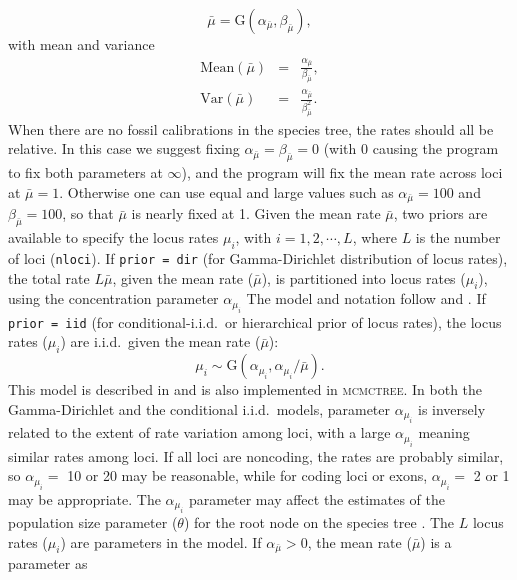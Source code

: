 \documentclass[a4paper]{book}
\numberwithin{equation}{section} \renewcommand{\baselinestretch}{0.55}
\begin{document}
\begin{displaymath}
  \bar{\mu} = \mathrm{G}(\alpha_{\bar{\mu}},\beta_{\bar{\mu}}),
\end{displaymath}
with mean and variance
\begin{eqnarray}
  \textrm{Mean}(\bar{\mu}) & = & \frac{\alpha_{\bar{\mu}}}{\beta_{\bar{\mu}}}, \nonumber \\
  \textrm{Var}(\bar{\mu}) & = & \frac{\alpha_{\bar{\mu}}}{\beta_{\bar{\mu}}^2}. \nonumber 
\end{eqnarray}
When there are no fossil calibrations in the species tree, the rates
should all be relative.  In this case we suggest fixing
$\alpha_{\bar{\mu}}=\beta_{\bar{\mu}}=0$ (with 0 causing the program
to fix both parameters at $\infty$), and the program will fix the mean
rate across loci at $\bar\mu = 1$.  Otherwise one can use equal and
large values such as $\alpha_{\bar{\mu}}=100$ and
$\beta_{\bar{\mu}}=100$, so that $\bar\mu$ is nearly fixed at 1.
Given the mean rate $\bar\mu$, two priors are available to specify the
locus rates $\mu_i$, with $i = 1, 2, \cdots, L$, where $L$ is the
number of loci (\texttt{nloci}).  If \texttt{prior = dir} (for
Gamma-Dirichlet distribution of locus rates), the total rate
$L\bar\mu$, given the mean rate ($\bar\mu$), is partitioned into locus
rates ($\mu_i$), using the concentration parameter $\alpha_{\mu_i}$
The model and notation follow \citet[][eq.~4]{Burgess2008} and
\citet[][eqs.~3-5]{dosReis2014}.  If \texttt{prior = iid} (for
conditional-i.i.d.\ or hierarchical prior of locus rates), the locus
rates ($\mu_i$) are i.i.d.\ given the mean rate ($\bar\mu$):
\begin{displaymath}
  \mu_i \sim \mathrm{G}(\alpha_{\mu_i},\alpha_{\mu_i}/\bar{\mu}).
\end{displaymath}
This model is described in \citet[][eq.~8]{Zhu2015} and is also
implemented in \textsc{mcmctree}.  In both the Gamma-Dirichlet and the
conditional i.i.d.\ models, parameter $\alpha_{\mu_i}$ is inversely
related to the extent of rate variation among loci, with a large
$\alpha_{\mu_i}$ meaning similar rates among loci.  If all loci are
noncoding, the rates are probably similar, so $\alpha_{\mu_i} =$ 10 or
20 may be reasonable, while for coding loci or exons,
$\alpha_{\mu_i} =$ 2 or 1 may be appropriate.  The $\alpha_{\mu_i}$
parameter may affect the estimates of the population size parameter
($\theta$) for the root node on the species tree \citep{Burgess2008}.
The $L$ locus rates ($\mu_i$) are parameters in the model.  If
$\alpha_{\bar{\mu}} > 0$, the mean rate ($\bar\mu$) is a parameter as
\end{document}
